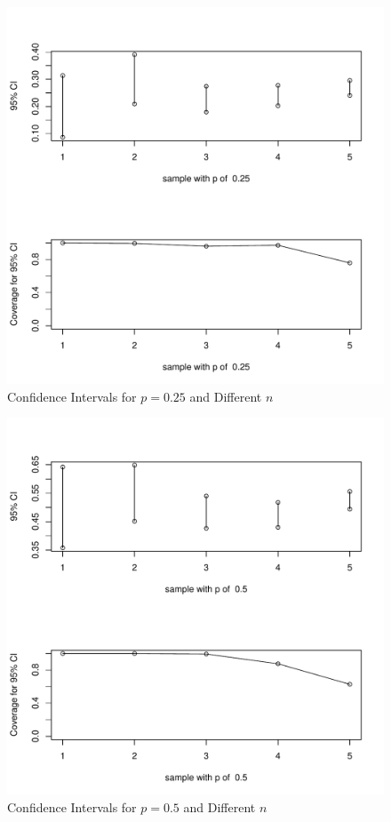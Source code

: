 \documentclass[12pt,letterpaper,titlepage,en-US]{article}
\begin{document}
\begin{figure}[H]
    \caption{Confidence Intervals for $p = 0.25$ and Different $n$}
    \label{sndp}
    \centering
    \includegraphics[width=.9\textwidth]{figure/sameP025.pdf}
\end{figure}
\begin{figure}[H]
    \caption{Confidence Intervals for $p = 0.5$ and Different $n$}
    \label{sndp}
    \centering
    \includegraphics[width=.9\textwidth]{figure/sameP05.pdf}
\end{figure}
\end{document}
